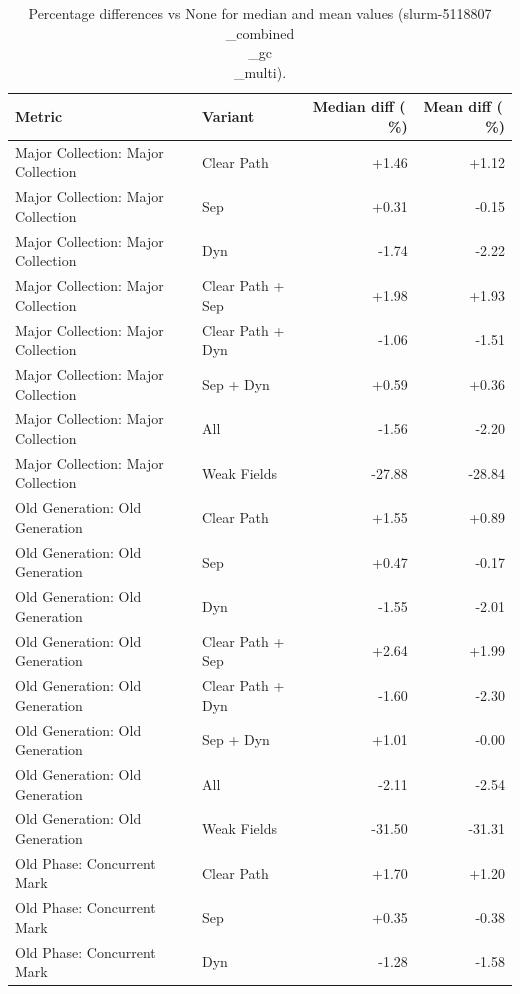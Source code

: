 \begin{table}[t]
\centering
\caption{Percentage differences vs None for median and mean values (slurm-5118807\\_combined\\_gc\\_multi).}
\label{tab:gc_metric_pct_diff_slurm-5118807\\_combined\\_gc\\_multi}
\begin{tabular}{llrr}
\toprule
Metric & Variant & Median diff (\,\%) & Mean diff (\,\%) \\
\midrule
Major Collection: Major Collection & Clear Path & +1.46 & +1.12 \\
Major Collection: Major Collection & Sep & +0.31 & -0.15 \\
Major Collection: Major Collection & Dyn & -1.74 & -2.22 \\
Major Collection: Major Collection & Clear Path + Sep & +1.98 & +1.93 \\
Major Collection: Major Collection & Clear Path + Dyn & -1.06 & -1.51 \\
Major Collection: Major Collection & Sep + Dyn & +0.59 & +0.36 \\
Major Collection: Major Collection & All & -1.56 & -2.20 \\
Major Collection: Major Collection & Weak Fields & -27.88 & -28.84 \\
Old Generation: Old Generation & Clear Path & +1.55 & +0.89 \\
Old Generation: Old Generation & Sep & +0.47 & -0.17 \\
Old Generation: Old Generation & Dyn & -1.55 & -2.01 \\
Old Generation: Old Generation & Clear Path + Sep & +2.64 & +1.99 \\
Old Generation: Old Generation & Clear Path + Dyn & -1.60 & -2.30 \\
Old Generation: Old Generation & Sep + Dyn & +1.01 & -0.00 \\
Old Generation: Old Generation & All & -2.11 & -2.54 \\
Old Generation: Old Generation & Weak Fields & -31.50 & -31.31 \\
Old Phase: Concurrent Mark & Clear Path & +1.70 & +1.20 \\
Old Phase: Concurrent Mark & Sep & +0.35 & -0.38 \\
Old Phase: Concurrent Mark & Dyn & -1.28 & -1.58 \\

\end{tabular}
\end{table}
